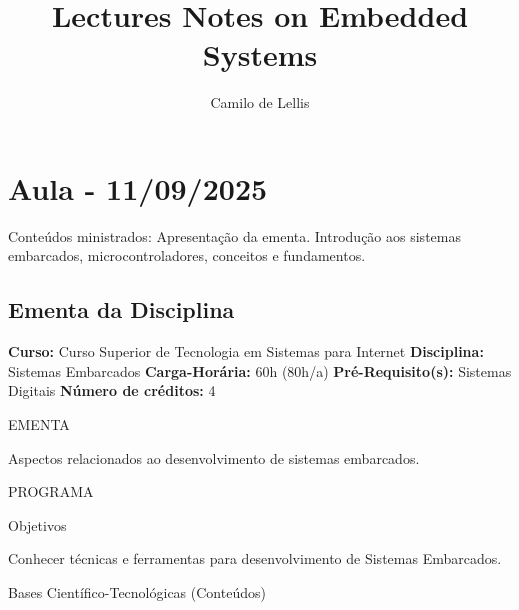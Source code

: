 \documentclass{article}
\title{Lectures Notes on Embedded Systems}
\author{Camilo de Lellis}
\begin{document}
\maketitle

\tableofcontents

\section{Aula - 11/09/2025}
Conteúdos ministrados:  Apresentação da ementa. Introdução aos sistemas embarcados, microcontroladores, conceitos e fundamentos.

\subsection{Ementa da Disciplina}
\textbf{Curso:} Curso Superior de Tecnologia em Sistemas para Internet
\textbf{Disciplina:} Sistemas Embarcados \textbf{Carga-Horária:} 60h (80h/a)
\textbf{Pré-Requisito(s):} Sistemas Digitais \textbf{Número de créditos:} 4

\begin{center}
EMENTA
\end{center}
Aspectos relacionados ao desenvolvimento de sistemas embarcados.

\begin{center}
PROGRAMA
\end{center}

\begin{center}
Objetivos
\end{center}
Conhecer técnicas e ferramentas para desenvolvimento de Sistemas Embarcados.

\begin{center}
Bases Científico-Tecnológicas (Conteúdos)
\end{center}
\end{document}
